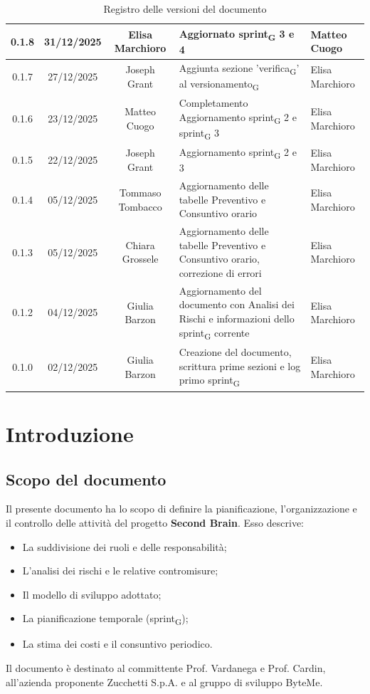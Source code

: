\documentclass[11pt,a4paper]{article}
\newcommand{\gls}[1]{#1\textsubscript{G}}
\begin{document}
\begin{table}[H]
\begin{tabular}{|c|c|c|>{\raggedright\arraybackslash}p{}|p{}|}
        \hline
        0.1.8 & 31/12/2025 & Elisa Marchioro & Aggiornato \gls{sprint} 3 e 4 & Matteo Cuogo\\ \hline
        0.1.7 & 27/12/2025 & Joseph Grant & Aggiunta sezione '\gls{verifica}' al \gls{versionamento} & Elisa Marchioro\\ \hline
        0.1.6 & 23/12/2025 & Matteo Cuogo & Completamento Aggiornamento \gls{sprint} 2 e \gls{sprint} 3 & Elisa Marchioro\\
        \hline
        0.1.5 & 22/12/2025 & Joseph Grant & Aggiornamento \gls{sprint} 2 e 3 & Elisa Marchioro\\
        \hline
        0.1.4 & 05/12/2025 & Tommaso Tombacco & Aggiornamento delle tabelle Preventivo e Consuntivo orario & Elisa Marchioro\\
        \hline
        0.1.3 & 05/12/2025 & Chiara Grossele & Aggiornamento delle tabelle Preventivo e Consuntivo orario, correzione di errori & Elisa Marchioro\\
        \hline
        0.1.2 & 04/12/2025 & Giulia Barzon & Aggiornamento del documento con Analisi dei Rischi e informazioni dello \gls{sprint} corrente & Elisa Marchioro\\
        \hline
        0.1.0 & 02/12/2025 & Giulia Barzon & Creazione del documento, scrittura prime sezioni e log primo \gls{sprint} & Elisa Marchioro\\
        \hline
    \end{tabular}
    \caption{Registro delle versioni del documento}
    \label{tab:versionamento}
\end{table}

\newpage

\tableofcontents
\thispagestyle{empty}
\newpage

\setcounter{page}{1}

\section{Introduzione}
\subsection{Scopo del documento}
Il presente documento ha lo scopo di definire la pianificazione, l’organizzazione e il controllo delle attività del progetto \textbf{Second Brain}. Esso descrive:
\begin{itemize}
    \item La suddivisione dei ruoli e delle responsabilità;
    \item L’analisi dei rischi e le relative contromisure;
    \item Il modello di sviluppo adottato;
    \item La pianificazione temporale (\gls{sprint});
    \item La stima dei costi e il consuntivo periodico.
\end{itemize}
Il documento è destinato al committente Prof. Vardanega e Prof. Cardin, all'azienda proponente Zucchetti S.p.A. e al gruppo di sviluppo ByteMe.
\end{document}

